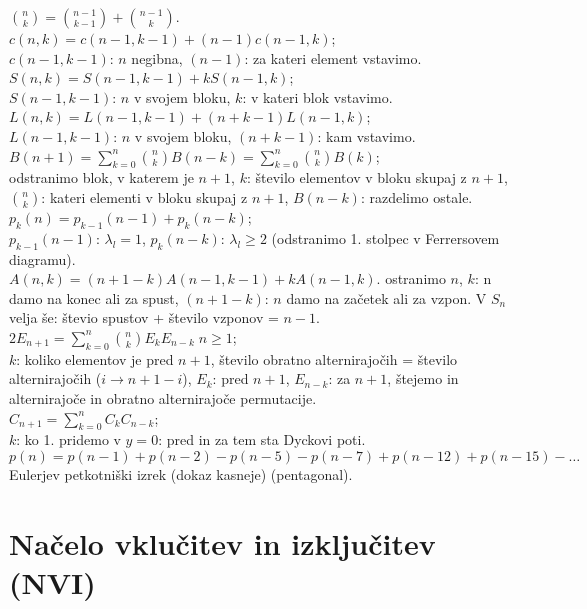\documentclass[a4paper, 12pt]{book}
\theoremstyle{definition}
\theoremstyle{remark}
\begin{document}
$\binom{n}{k} = \binom{n-1}{k-1} + \binom{n-1}{k}$. \\
$c(n,k) = c(n-1,k-1) + (n-1) c(n-1,k)$; \\
$c(n-1,k-1)$: $n$ negibna, $(n-1)$: za kateri element vstavimo. \\
$S(n,k) = S(n-1,k-1) + k S(n-1,k)$; \\
$S(n-1,k-1)$: $n$ v svojem bloku, $k$: v kateri blok vstavimo. \\
$L(n,k) = L(n-1,k-1) + (n+k-1) L(n-1,k)$; \\
$L(n-1,k-1)$: $n$ v svojem bloku, $(n+k-1)$: kam vstavimo. \\
$B(n+1) = \sum_{k=0}^{n} \binom{n}{k} B(n-k) = \sum_{k=0}^{n} \binom{n}{k} B(k)$; \\
odstranimo blok, v katerem je $n+1$, $k$: število elementov v bloku skupaj z $n+1$,
$\binom{n}{k}$: kateri elementi v bloku skupaj z $n+1$, $B(n-k)$: razdelimo ostale. \\
$p_k(n) = p_{k-1}(n-1) + p_k(n-k)$; \\
$p_{k-1}(n-1)$: $\lambda_l = 1$, $p_k(n-k)$: $\lambda_l \geq 2$ (odstranimo 1. stolpec v Ferrersovem diagramu). \\
$A(n,k) = (n+1-k) A(n-1,k-1) + k A(n-1,k)$.
ostranimo $n$, $k$: n damo na konec ali za spust, $(n+1-k)$: $n$ damo na začetek ali za vzpon.
V $S_n$ velja še: števio spustov + število vzponov = $n-1$. \\
$2 E_{n+1} = \sum_{k=0}^{n} \binom{n}{k} E_k E_{n-k} \; n \geq 1$; \\
$k$: koliko elementov je pred $n+1$, število obratno alternirajočih = število alternirajočih ($i \to n+1-i$),
$E_k$: pred $n+1$, $E_{n-k}$: za $n+1$, štejemo in alternirajoče in obratno alternirajoče permutacije. \\
$C_{n+1} = \sum_{k=0}^{n} C_k C_{n-k}$; \\
$k$: ko 1. pridemo v $y=0$: pred in za tem sta Dyckovi poti. \\
$p(n) = p(n-1) + p(n-2) - p(n-5) - p(n-7) + p(n-12) + p(n-15) - \dots$ \\
Eulerjev petkotniški izrek (dokaz kasneje) (pentagonal).


\section{Načelo vklučitev in izključitev (NVI)}
\end{document}

